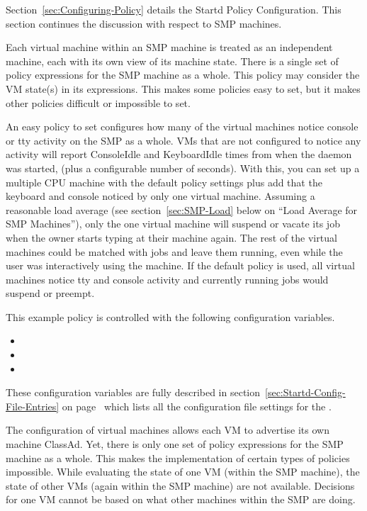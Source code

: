 Section~\ref{sec:Configuring-Policy} details the Startd
Policy Configuration.
This section continues the discussion with respect to SMP machines.

Each virtual machine within an SMP machine is treated as an
independent machine,
each with its own view of its machine state.
There is a single set of policy expressions for the SMP machine
as a whole.
This policy may consider the VM state(s) in its expressions.
This makes some policies easy to set, but it makes
other policies difficult or impossible to set.

An easy policy to set
configures how many of the virtual machines
notice console or tty activity on the SMP as a whole.
VMs that are not configured to notice any activity will report
ConsoleIdle and KeyboardIdle times from when the
 daemon was started,
(plus a configurable number of seconds).
With this, you can set up a multiple CPU machine with
the default policy
settings plus add that the keyboard and console noticed by only one
virtual machine.
Assuming a reasonable load average (see
section~\ref{sec:SMP-Load} below on ``Load Average for SMP
Machines''), only the one virtual machine will suspend or vacate its job
when the owner starts typing at their machine again.
The rest of the virtual machines could be matched with jobs and leave
them running, even while the user was interactively using the
machine. 
If the default policy is used,
all virtual machines notice
tty and console activity
and
currently running jobs would suspend or preempt.

This example policy is
controlled with the following configuration variables.
\begin{itemize}
\item {}
\item {}
\item {}
\end{itemize}

These configuration variables are fully described in
section~\ref{sec:Startd-Config-File-Entries} on
page~\pageref{sec:Startd-Config-File-Entries} which lists all the
configuration file settings for the .

The configuration of virtual machines allows each VM to advertise
its own machine ClassAd.
Yet, there is only one set of policy expressions for the SMP
machine as a whole.
This makes the implementation of certain types of policies impossible.
While evaluating the state of one VM (within the SMP machine),
the state of other VMs (again within the SMP machine) are not
available.
Decisions for one VM cannot be based on what other machines within the SMP
are doing.

